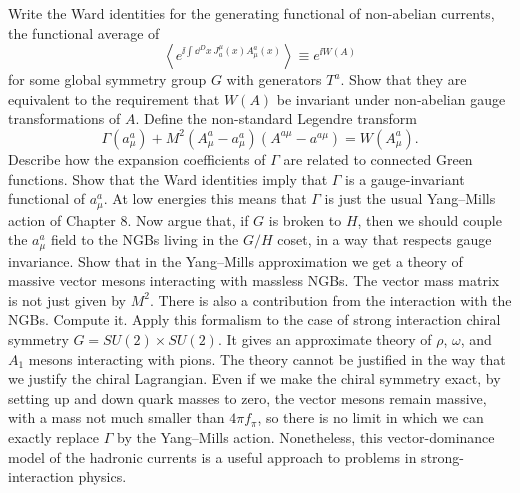 \begin{banksproblems}
Write the Ward identities for the generating functional of non-abelian
currents, the functional average of
\begin{equation*}
  \left\langle e^{\ii\int\dd^D x\,J_a^\mu(x)A_\mu^a(x)}\right\rangle
  \equiv e^{\ii W(A)}
\end{equation*}
for some global symmetry group $G$ with generators $T^a$. Show that they are
equivalent to the requirement that $W(A)$ be invariant under non-abelian gauge
transformations of $A$. Define the non-standard Legendre transform
\begin{equation*}
  \Gamma(a_\mu^a)+M^2(A_\mu^a-a_\mu^a)(A^{a\mu}-a^{a\mu})=W(A_\mu^a).
\end{equation*}
Describe how the expansion coefficients of $\Gamma$ are related to connected
Green functions. Show that the Ward identities imply that $\Gamma$ is a
gauge-invariant functional of $a_\mu^a$. At low energies this means that
$\Gamma$ is just the usual Yang--Mills action of Chapter 8. Now argue that, if
$G$ is broken to $H$, then we should couple the $a_\mu^a$ field to the NGBs
living in the $G/H$ coset, in a way that respects gauge invariance. Show that
in the Yang--Mills approximation we get a theory of massive vector mesons
interacting with massless NGBs. The vector mass matrix is not just given by
$M^2$. There is also a contribution from the interaction with the NGBs.
Compute it. Apply this formalism to the case of strong interaction chiral
symmetry $G=SU(2)\times SU(2)$. It gives an approximate theory of $\rho$,
$\omega$, and $A_1$ mesons interacting with pions. The theory cannot be
justified in the way that we justify the chiral Lagrangian. Even if we make the
chiral symmetry exact, by setting up and down quark masses to zero, the vector
mesons remain massive, with a mass not much smaller than $4\pi f_\pi$, so there
is no limit in which we can exactly replace $\Gamma$ by the Yang--Mills action.
Nonetheless, this vector-dominance model of the hadronic currents is a useful
approach to problems in strong-interaction physics.

\end{banksproblems}
